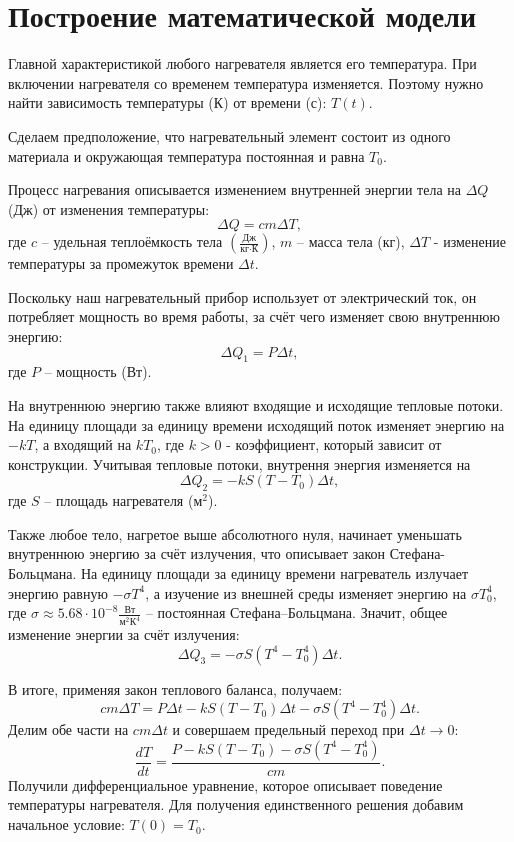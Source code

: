  \section{Построение математической модели}
    Главной характеристикой любого нагревателя является его температура. При включении нагревателя со временем температура изменяется. Поэтому нужно найти зависимость температуры (К) от времени (с): $ T(t) $.

    Сделаем предположение, что нагревательный элемент состоит из одного материала и окружающая температура постоянная и равна $T_0$.%
    
    Процесс нагревания описывается изменением внутренней энергии тела на $ \Delta Q $ (Дж) от изменения температуры:
    \[
        \Delta Q = cm \Delta T,
    \]
    где $c$ -- удельная теплоёмкость тела $\left(\frac{\text{Дж}}{\text{кг} \cdot \text{К}}\right)$, $m$ -- масса тела (кг), $ \Delta T $ - изменение температуры за промежуток времени $\Delta t$.

    Поскольку наш нагревательный прибор использует от электрический ток, он потребляет мощность во время работы, за счёт чего изменяет свою внутреннюю энергию:
    \[
        \Delta Q_1 = P \Delta t,
    \]
    где $P$ -- мощность (Вт). 

    На внутреннюю энергию также влияют входящие и исходящие тепловые потоки. На единицу площади за единицу времени исходящий поток изменяет энергию на $ -k T $, а входящий на $ k T_0 $, где $ k > 0$ - коэффициент, который зависит от конструкции. Учитывая тепловые потоки, внутрення энергия изменяется на
    \[
        \Delta Q_2 = -k S (T - T_0) \Delta t,
    \]
    где $S$ -- площадь нагревателя ($\text{м}^2$).

    Также любое тело, нагретое выше абсолютного нуля, начинает уменьшать внутреннюю энергию за счёт излучения, что описывает закон Стефана-Больцмана. На единицу площади за единицу времени нагреватель излучает энергию равную $ -\sigma T^4 $, а изучение из внешней среды изменяет энергию на $ \sigma T_0^4 $, где $\sigma \approx 5.68 \cdot 10^{-8} \frac{\text{Вт}}{\text{м}^2 \text{К}^4}$ -- постоянная Стефана--Больцмана. Значит, общее изменение энергии за счёт излучения:
    \[
        \Delta Q_3 = -\sigma S (T^4 - T_0^4) \Delta t.
    \]


    В итоге, применяя закон теплового баланса, получаем:
    \[
        cm\Delta T = P \Delta t - k S (T - T_0) \Delta t - \sigma S (T^4 - T_0^4) \Delta t.
    \]
    Делим обе части на $ cm \Delta t $ и совершаем предельный переход при $ \Delta t \to 0 $:
    \[
        \frac{dT}{dt} = \frac{ P - k S (T - T_0) - \sigma S (T^4 - T_0^4) }{cm}.
    \]
    Получили дифференциальное уравнение, которое описывает поведение температуры нагревателя. Для получения единственного решения добавим начальное условие: \( T(0) = T_0 \).

